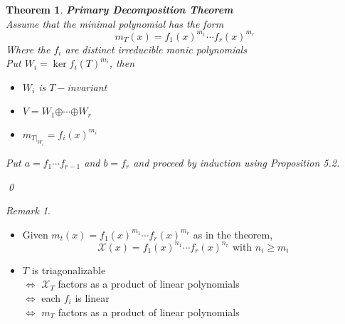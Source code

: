 \documentclass[11pt, a4paper]{report}
\makeatletter
\numberwithin{equation}{section}
\renewcommand{\chi}{\mathcal{X}}
\newcommand{\opl}{\boldsymbol{\oplus}}
\numberwithin{equation}{subsection}
\theoremstyle{plain}
\newtheorem{thm}{Theorem}[chapter] %
\theoremstyle{definition}
\theoremstyle{remark}
\newtheorem*{rem}{Remark}
\newtheorem*{prf}{Proof}
\renewenvironment{prf}[1][\proofname]{\par
  \vspace{-\topsep}%
  \normalfont
  \topsep0pt \partopsep0pt %
  \trivlist
  \item[\hskip\labelsep
        \itshape
    #1\@addpunct{.}]\ignorespaces
}{%
  \popQED\endtrivlist\@endpefalse
  \addvspace{6pt plus 6pt} %
}
\newcommand{\pr}[1]{\begin{adjustwidth}{1cm}{} \begin{prf} #1 \end{prf} \end{adjustwidth}}
\makeatother
\begin{document}
\newpage

\begin{thm}\textnormal{\textbf{Primary Decomposition Theorem}}\\
Assume that the minimal polynomial has the form
$$m_T(x) = f_1(x)^{m_1} \cdots f_r(x)^{m_r}$$
Where the $f_i$ are distinct irreducible monic polynomials\\
Put $W_i = \ker f_i(T)^{m_i}$, then
\begin{itemize}
\item $W_i$ is $T-$invariant
\item $V = W_1 \opl \cdots \opl W_r$
\item $m_{T|_{W_i}} = f_i(x)^{m_i}$
\end{itemize}

\pr{
Put $a = f_1 \cdots f_{r-1}$ and $b = f_r$ and proceed by induction using Proposition 5.2.
}\qed
\end{thm}

\begin{rem}${}$
\begin{itemize}
\item Given $m_t(x) = f_1(x)^{m_1} \cdots f_r(x)^{m_r}$ as in the theorem, $$\chi(x) = f_1(x)^{n_1} \cdots f_r(x)^{n_r} \text{ with } n_i \geq m_i$$
\pr{
}\vfill
\item 	$T$ is triagonalizable\\
		$\Leftrightarrow$ $\chi_T$ factors as a product of linear polynomials\\
		$\Leftrightarrow$ each $f_i$ is linear\\
		$\Leftrightarrow$ $m_T$ factors as a product of linear polynomials
\end{itemize}
\end{rem}



\newpage
\end{document}
